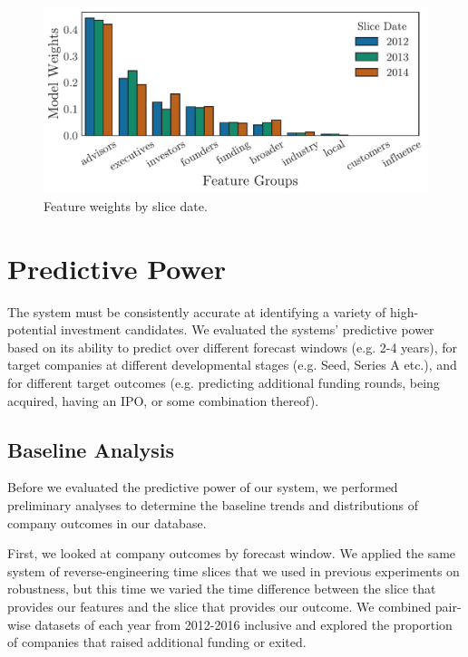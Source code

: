 \documentclass[../thesis/thesis.tex]{subfiles}
\begin{document}
\begin{figure}[!htb] %
    \centering
    \includegraphics[width=\textwidth]{../figures/evaluation/features_slice}
    \caption[Feature weights by slice date]{Feature weights by slice date.}
    \label{fig:evaluation:feature_groups_slice}
\end{figure}

\section{Predictive Power}

The system must be consistently accurate at identifying a variety of high-potential investment candidates. We evaluated the systems' predictive power based on its ability to predict over different forecast windows (e.g. 2-4 years), for target companies at different developmental stages (e.g. Seed, Series A etc.), and for different target outcomes (e.g. predicting additional funding rounds, being acquired, having an IPO, or some combination thereof).

\subsection{Baseline Analysis}

Before we evaluated the predictive power of our system, we performed preliminary analyses to determine the baseline trends and distributions of company outcomes in our database.

First, we looked at company outcomes by forecast window. We applied the same system of reverse-engineering time slices that we used in previous experiments on robustness, but this time we varied the time difference between the slice that provides our features and the slice that provides our outcome. We combined pair-wise datasets of each year from 2012-2016 inclusive and explored the proportion of companies that raised additional funding or exited.
\end{document}
